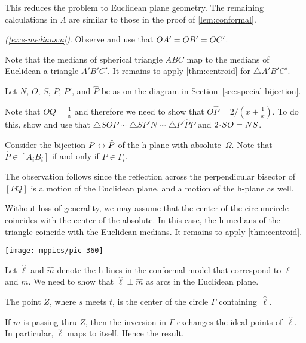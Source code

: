 \begin{multicols}{2}
This reduces the problem to Euclidean plane geometry.
The remaining calculations in $\Lambda$ are similar to those in the proof of \ref{lem:conformal}.

\textit{(\ref{ex:s-medians:a})}.
Observe and use that 
$OA'\z=OB'\z=OC'$.

 Note that the medians of spherical triangle $ABC$ 
map to the medians of Euclidean a triangle $A'B'C'$.
It remains to apply \ref{thm:centroid} for $\triangle A'B'C'$.

\setcounter{eqtn}{0}

Let $N$, $O$, $S$, $P$, $P'$, and $\hat P$ 
be as on the diagram in Section~\ref{sec:special-bijection}.

Note that $OQ=\tfrac1x$ and therefore we need to show that $O\hat P=2/(x+\tfrac1x)$.
To do this, show and use that 
$\triangle SOP\sim \triangle SP'N\sim \triangle P'\hat PP$
and
$2\cdot SO\z=NS$.


Consider the bijection $P\z\leftrightarrow \hat P$ of the h-plane with absolute~$\Omega$.
Note that $\hat P\in [A_iB_i]$ if and only if $P\in\Gamma_i$.

The observation follows since the reflection across the perpendicular bisector of $[PQ]$ is a motion of the Euclidean plane, and a motion of the h-plane as well.

Without loss of generality, we may assume that 
the center of the circumcircle coincides with the center of the absolute.
In this case, the h-medians of the triangle coincide with the Euclidean medians.
It remains to apply \ref{thm:centroid}.

\begin{Figure}
\centering
\vskip-0mm
\texttt{[image: mppics/pic-360]}
\end{Figure}

Let $\hat\ell$ and $\hat m$ denote the h-lines in the conformal model that correspond to $\ell$ and $m$.
We need to show that $\hat\ell\perp\hat m$ as arcs in the Euclidean plane.

The point $Z$, where $s$ meets $t$, is the center of the circle $\Gamma$ containing~$\hat\ell$.

If $\bar m$ is passing thru $Z$, then the inversion in $\Gamma$ exchanges the ideal points of~$\hat\ell$.
In particular, $\hat\ell$ maps to itself. 
Hence the result.


\end{multicols}
